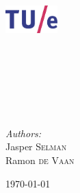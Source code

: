 \begin{titlepage}
	\begin{center}

		\includegraphics[width=0.15\textwidth]{Images/tuelogo}\\[1cm]

		\textsc{\LARGE \uni}\\[0.2cm]

		\textsc{\fase}\\[1.6cm]

        \textsc{\LARGE \vak}\\[0.5cm]

\HRule \\[0.4cm]
{ \huge \bfseries \essaytitle}\\[0.4cm]

\HRule \\[1.5cm]

		\begin{minipage}{0.5\textwidth}
			\begin{flushleft} \large
				\emph{Authors:}\\
				Jasper \textsc{Selman} \\
				Ramon \textsc{de Vaan}
			\end{flushleft}
		\end{minipage}

		\vfill

		{\large \today} \\
		\stad

	\end{center}
\end{titlepage} 